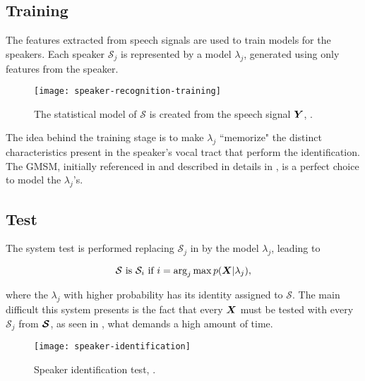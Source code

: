 \subsection{Training}

The features extracted from speech signals are used to train models for the speakers. Each speaker $\mathcal{S}_j$ is represented by a model $\lambda_j$, generated using only features from the speaker.

\begin{figure}[ht]
    \centering
    \texttt{[image: speaker-recognition-training]}
    \caption{The statistical model of $\mathcal{S}$ is created from the speech signal $\boldsymbol{Y}$, .}
    \label{fig:speaker-recognition-training}
\end{figure}

The idea behind the training stage is to make $\lambda_j$ ``memorize" the distinct characteristics present in the speaker's vocal tract that perform the identification. The GMSM, initially referenced in  and described in details in , is a perfect choice to model the $\lambda_j$'s.

\subsection{Test}

The system test is performed replacing $\mathcal{S}_j$ in  by the model $\lambda_j$, leading to

\begin{equation}
    \mathcal{S} \text{ is } \mathcal{S}_i \text{ if } i = \arg_j\max\postpdf{\boldsymbol{X}}{\lambda_j},
    \label{eq:speaker_identification}
\end{equation}

\noindent where the $\lambda_j$ with higher probability has its identity assigned to $\mathcal{S}$. The main difficult this system presents is the fact that every $\boldsymbol{X}$ must be tested with every $\mathcal{S}_j$ from $\boldsymbol{\mathcal{S}}$, as seen in , what demands a high amount of time.

\begin{figure}[ht]
    \centering
    \texttt{[image: speaker-identification]}
    \caption{Speaker identification test, .}
    \label{fig:speaker_identification}
\end{figure}

